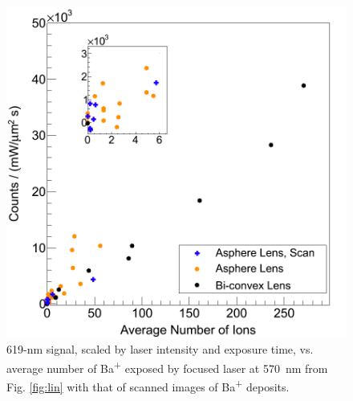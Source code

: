 \begin{figure} %
        \centering
                \includegraphics[width=.5\textwidth]{figures/lin_withScan_lin.png}
                \caption{619-nm signal, scaled by laser intensity and exposure time, vs. average number of Ba\textsuperscript{+} exposed by focused laser at 570~nm from Fig. \ref{fig:lin} with that of scanned images of Ba\textsuperscript{+} deposits.}
\label{fig:linScan}
\end{figure}


